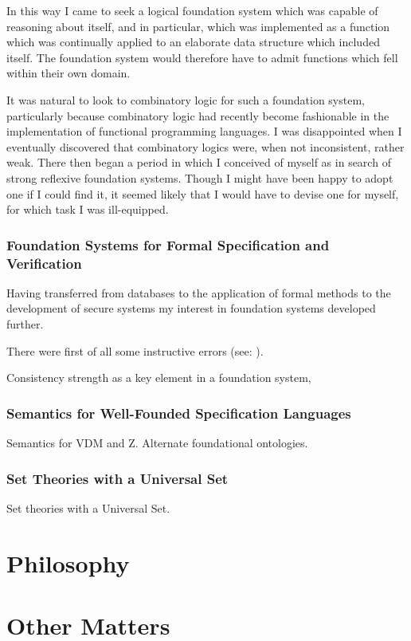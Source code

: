 In this way I came to seek a logical foundation system which was capable of reasoning about itself, and in particular, which was implemented as a function which was continually applied to an elaborate data structure which included itself.
The foundation system would therefore have to admit functions which fell within their own domain.

It was natural to look to combinatory logic for such a foundation system, particularly because combinatory logic had recently become fashionable in the implementation of functional programming languages.
I was disappointed when I eventually discovered that combinatory logics were, when not inconsistent, rather weak.
There then began a period in which I conceived of myself as in search of strong reflexive foundation systems.
Though I might have been happy to adopt one if I could find it, it seemed likely that I would have to devise one for myself, for which task I was ill-equipped. 

\subsection[Foundation Systems]{Foundation Systems for Formal Specification and Verification}

Having transferred from databases to the application of formal methods to the development of secure systems my interest in foundation systems developed further.

There were first of all some instructive errors (see: \cite{jones86a,jones86b}).

Consistency strength as a key element in a foundation system,

\subsection[Well-Founded Semantics]{Semantics for Well-Founded Specification Languages}

Semantics for VDM and Z.
Alternate foundational ontologies.

\subsection{Set Theories with a Universal Set}
Set theories with a Universal Set.

\chapter{Philosophy}

\chapter{Other Matters}

